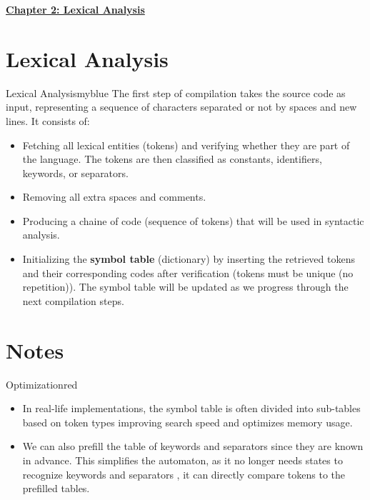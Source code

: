 
\newpage
\null

\begin{center}
    \Huge{\textbf{\underline{Chapter 2: Lexical Analysis}}}
\end{center}

\setcounter{section}{0}

\vspace{0.35cm}


\section{Lexical Analysis}

\begin{prettyBox}{Lexical Analysis}{myblue}
The first step of compilation takes the source code as input,  
representing a sequence of characters separated or not by  
spaces and new lines. It consists of:  

\begin{itemize}
    \item Fetching all lexical entities (tokens) and verifying  
        whether they are part of the language. The tokens are then  
        classified as constants, identifiers, keywords, or separators.  
    \item Removing all extra spaces and comments.  
    \item Producing a chaine of code (sequence of tokens) that will be used in syntactic analysis.  
    \item Initializing the \textbf{symbol table} (dictionary) by inserting  
        the retrieved tokens and their corresponding codes after verification (tokens must be unique (no repetition)). The symbol table will be updated  
        as we progress through the next compilation steps.  
\end{itemize}
\end{prettyBox}

\vspace{0.75cm}
\section{Notes}

\begin{prettyBox}{Optimization}{red}

\begin{itemize}
    \item In real-life implementations, the symbol table is often divided into sub-tables  
        based on token types improving search speed  
        and optimizes memory usage.  
    \item We can also prefill the table of keywords and separators since they are known
in advance. This simplifies the automaton, as it no longer needs states to recognize keywords and separators , it can directly compare tokens to the prefilled tables.
\end{itemize}
\end{prettyBox}

